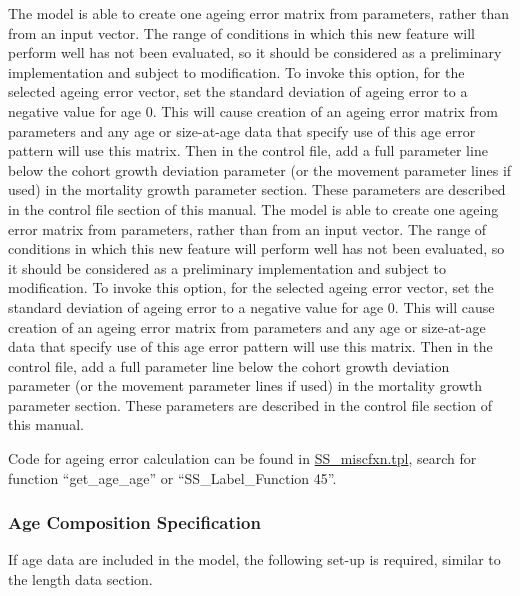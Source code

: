 The model is able to create one ageing error matrix from parameters, rather than from an input vector. The range of conditions in which this new feature will perform well has not been evaluated, so it should be considered as a preliminary implementation and subject to modification. To invoke this option, for the selected ageing error vector, set the standard deviation of ageing error to a negative value for age 0. This will cause creation of an ageing error matrix from parameters and any age or size-at-age data that specify use of this age error pattern will use this matrix. Then in the control file, add a full parameter line below the cohort growth deviation parameter (or the movement parameter lines if used) in the mortality growth parameter section. These parameters are described in the control file section of this manual.
The model is able to create one ageing error matrix from parameters, rather than from an input vector. The range of conditions in which this new feature will perform well has not been evaluated, so it should be considered as a preliminary implementation and subject to modification. To invoke this option, for the selected ageing error vector, set the standard deviation of ageing error to a negative value for age 0. This will cause creation of an ageing error matrix from parameters and any age or size-at-age data that specify use of this age error pattern will use this matrix. Then in the control file, add a full parameter line below the cohort growth deviation parameter (or the movement parameter lines if used) in the mortality growth parameter section. These parameters are described in the control file section of this manual.

Code for ageing error calculation can be found in \href{https://github.com/nmfs-stock-synthesis/stock-synthesis/blob/main/SS_miscfxn.tpl}{SS\_miscfxn.tpl}, search for function ``get\_age\_age'' or ``SS\_Label\_Function 45''.

\subsubsection{Age Composition Specification}
If age data are included in the model, the following set-up is required, similar to the length data section.

